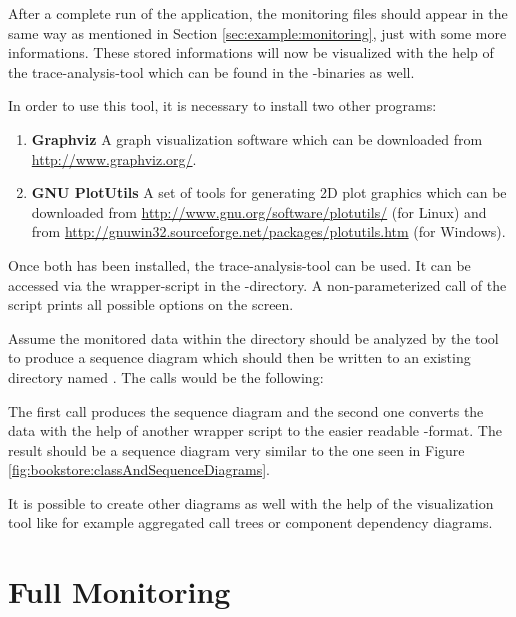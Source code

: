 \setBashListing



After a complete run of the application, the monitoring files should appear in the same way as mentioned in Section \ref{sec:example:monitoring}, just with some more informations. These stored informations will now be visualized with the help of the trace-analysis-tool which can be found in the \Kieker{}-binaries as well.

In order to use this tool, it is necessary to install two other programs:
\begin{enumerate}
\item \textbf{Graphviz} A graph visualization software which can be downloaded from \url{http://www.graphviz.org/}. 
\item \textbf{GNU PlotUtils} A set of tools for generating 2D plot graphics which can be downloaded from \url{http://www.gnu.org/software/plotutils/} (for Linux) and from \url{http://gnuwin32.sourceforge.net/packages/plotutils.htm} (for Windows).
\end{enumerate}
Once both has been installed, the trace-analysis-tool can be used. It can be accessed via the wrapper-script  in the -directory. A non-parameterized call of the script prints all possible options on the screen.

Assume the monitored data within the directory  should be analyzed by the tool to produce a sequence diagram which should then be written to an existing directory named . The calls would be the following:
\setBashListing

The first call produces the sequence diagram and the second one converts the data with the help of another wrapper script to the easier readable -format. The result should be a sequence diagram very similar to the one seen in Figure \ref{fig:bookstore:classAndSequenceDiagrams}.

It is possible to create other diagrams as well with the help of the visualization tool like for example aggregated call trees or component dependency diagrams. 

\section{Full Monitoring}\label{sec:aspectJ:fullweaving}
